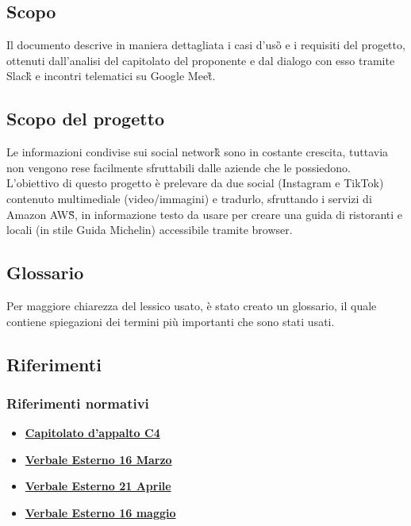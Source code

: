 \subsection{Scopo}
Il documento descrive in maniera dettagliata i casi d'uso\G{} e i requisiti del progetto, 
ottenuti dall'analisi del capitolato del proponente \proponente{} e dal dialogo con esso tramite Slack\G{} e incontri telematici su Google Meet\G{}.

\subsection{Scopo del progetto}
Le informazioni condivise sui social network\G{} sono in costante crescita, tuttavia 
non vengono rese facilmente sfruttabili dalle aziende che le possiedono. 
L'obiettivo di questo progetto è prelevare da due social (Instagram e TikTok) 
contenuto multimediale (video/immagini) e tradurlo, sfruttando i servizi di Amazon AWS\G{}, in informazione testo da usare per creare una guida di ristoranti e locali
(in stile Guida Michelin) accessibile tramite browser. 

\subsection{Glossario}
Per maggiore chiarezza del lessico usato, è stato creato un glossario, il quale 
contiene spiegazioni dei termini più importanti che sono stati usati.

\subsection{Riferimenti}
\subsubsection{Riferimenti normativi}
\begin{itemize}
	\item
	\href{https://www.math.unipd.it/~tullio/IS-1/2021/Progetto/C4.pdf}{\textbf{Capitolato d'appalto C4}}
    \item
    \href{https://github.com/Bug-s-Bunny-Team/docs/blob/dev/src/Esterni/Verbali/ve_20220316.tex}{\textbf{Verbale Esterno 16 Marzo}}
    \item
	\href{https://github.com/Bug-s-Bunny-Team/docs/blob/dev/src/Esterni/Verbali/ve_20220421.tex}{\textbf{Verbale Esterno 21 Aprile}}
    \item
	\href{https://github.com/Bug-s-Bunny-Team/docs/blob/dev/src/Esterni/Verbali/ve_20220516.tex}{\textbf{Verbale Esterno 16 maggio}}

\end{itemize}

